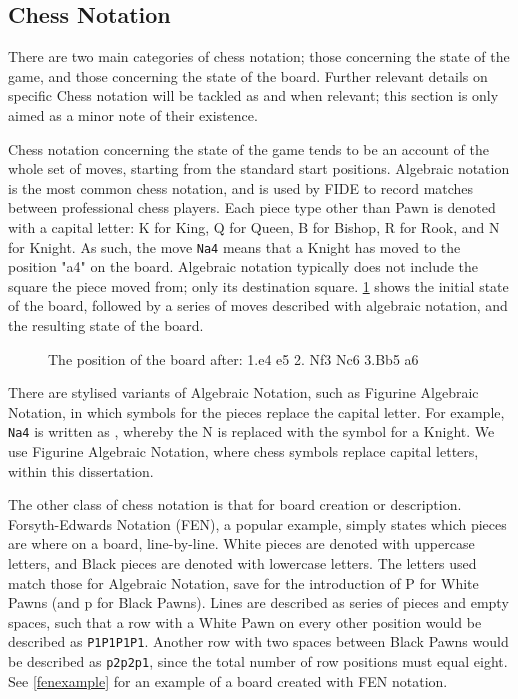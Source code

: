 \subsection{Chess Notation} \label{fensection}

There are two main categories of chess notation; those concerning the state of the game, and those concerning the state of the board. Further relevant details on specific Chess notation will be tackled as and when relevant; this section is only aimed as a minor note of their existence.

Chess notation concerning the state of the game tends to be an account of the whole set of moves, starting from the standard start positions. Algebraic notation is the most common chess notation, and is used by FIDE to record matches between professional chess players. Each piece type other than Pawn is denoted with a capital letter: K for King, Q for Queen, B for Bishop, R for Rook, and N for Knight. As such, the move \texttt{Na4} means that a Knight has moved to the position "a4" on the board. Algebraic notation typically does not include the square the piece moved from; only its destination square. \cref{algebraicexample} shows the initial state of the board, followed by a series of moves described with algebraic notation, and the resulting state of the board.

\begin{figure}[h]
    \centering
    \newgame
    \showboard
    \caption{The position of the board after: 1.e4 e5 2. Nf3 Nc6 3.Bb5 a6}
    \label{algebraicexample}
\end{figure}

There are stylised variants of Algebraic Notation, such as Figurine Algebraic Notation, in which symbols for the pieces replace the capital letter. For example, \texttt{Na4} is written as , whereby the N is replaced with the symbol for a Knight. We use Figurine Algebraic Notation, where chess symbols replace capital letters, within this dissertation.

The other class of chess notation is that for board creation or description. Forsyth-Edwards Notation (FEN), a popular example, simply states which pieces are where on a board, line-by-line. White pieces are denoted with uppercase letters, and Black pieces are denoted with lowercase letters. The letters used match those for Algebraic Notation, save for the introduction of P for White Pawns (and p for Black Pawns). Lines are described as series of pieces and empty spaces, such that a row with a White Pawn on every other position would be described as \texttt{P1P1P1P1}. Another row with two spaces between Black Pawns would be described as \texttt{p2p2p1}, since the total number of row positions must equal eight. See \cref{fenexample} for an example of a board created with FEN notation.


